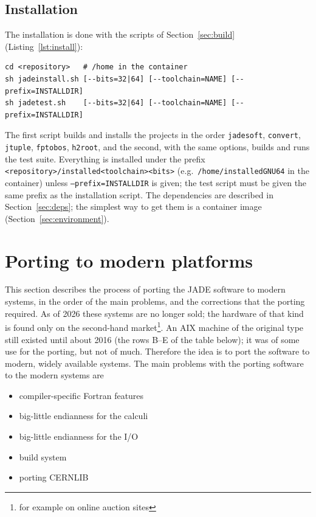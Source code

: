\subsection{Installation}
The installation is done with the scripts of Section~\ref{sec:build} (Listing~\ref{lst:install}):
\begin{lstlisting}[caption={Installation and test of the software with the scripts of the repository.},label={lst:install}]
cd <repository>   # /home in the container
sh jadeinstall.sh [--bits=32|64] [--toolchain=NAME] [--prefix=INSTALLDIR]
sh jadetest.sh    [--bits=32|64] [--toolchain=NAME] [--prefix=INSTALLDIR]
\end{lstlisting}
The first script builds and installs the projects in the order \texttt{jadesoft}, \texttt{convert}, \texttt{jtuple},
\texttt{fptobos}, \texttt{h2root}, and the second, with the same options, builds and runs the test suite. Everything is installed under the
prefix \texttt{<repository>/installed<toolchain><bits>} (e.g.\ \texttt{/home/installedGNU64} in the container) unless \texttt{--prefix=INSTALLDIR} is given; the test script must be given the same prefix as the installation script. The dependencies are described in
Section~\ref{sec:deps}; the simplest way to get them is a container image (Section~\ref{sec:environment}).

\section{Porting to modern platforms}
\label{sec:porting}
This section describes the process of porting the JADE software to modern systems, in the order of the main problems, and the corrections that the porting required.
As of 2026 these systems are no longer sold; the hardware of that kind is found only on the second-hand market\footnote{for example on online auction sites}.
An AIX machine of the original type~\cite{Wiki:AIX} still existed until about 2016 (the rows B--E of the table below); it was of
some use for the porting, but not of much. Therefore the idea is to port the software to modern, widely available systems.
The main problems with the porting software to the modern systems are
\begin{itemize}
\item  compiler-specific Fortran features
\item  big-little endianness for the calculi
\item  big-little endianness for the I/O
\item  build system 
\item  porting CERNLIB
\end{itemize}

